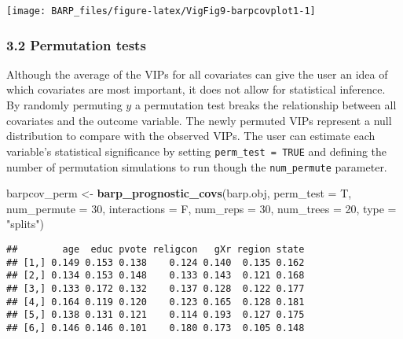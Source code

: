 \documentclass[]{article}
\newenvironment{Shaded}{\begin{snugshade}}{\end{snugshade}}
\newcommand{\KeywordTok}[1]{\textcolor[rgb]{0.13,0.29,0.53}{\textbf{#1}}}
\newcommand{\DataTypeTok}[1]{\textcolor[rgb]{0.13,0.29,0.53}{#1}}
\newcommand{\DecValTok}[1]{\textcolor[rgb]{0.00,0.00,0.81}{#1}}
\newcommand{\StringTok}[1]{\textcolor[rgb]{0.31,0.60,0.02}{#1}}
\newcommand{\OperatorTok}[1]{\textcolor[rgb]{0.81,0.36,0.00}{\textbf{#1}}}
\newcommand{\NormalTok}[1]{#1}
\begin{document}
\begin{center}\texttt{[image: BARP\_files/figure-latex/VigFig9-barpcovplot1-1]} \end{center}

\subsubsection{3.2 Permutation tests}\label{permutation-tests}

Although the average of the VIPs for all covariates can give the user an
idea of which covariates are most important, it does not allow for
statistical inference. By randomly permuting \(y\) a permutation test
breaks the relationship between all covariates and the outcome variable.
The newly permuted VIPs represent a null distribution to compare with
the observed VIPs. The user can estimate each variable's statistical
significance by setting \texttt{perm\_test\ =\ TRUE} and defining the
number of permutation simulations to run though the
\texttt{num\_permute} parameter.

\begin{Shaded}
\begin{Highlighting}[]
\NormalTok{barpcov_perm <-}\StringTok{ }\KeywordTok{barp_prognostic_covs}\NormalTok{(barp.obj,}
                                \DataTypeTok{perm_test =}\NormalTok{ T,}
                                \DataTypeTok{num_permute =} \DecValTok{30}\NormalTok{,}
                                \DataTypeTok{interactions =}\NormalTok{ F,}
                                \DataTypeTok{num_reps =} \DecValTok{30}\NormalTok{,}
                                \DataTypeTok{num_trees =} \DecValTok{20}\NormalTok{,}
                                \DataTypeTok{type =} \StringTok{"splits"}\NormalTok{)}
\end{Highlighting}
\end{Shaded}

\begin{Shaded}
\end{Shaded}

\begin{verbatim}
##        age  educ pvote religcon   gXr region state
## [1,] 0.149 0.153 0.138    0.124 0.140  0.135 0.162
## [2,] 0.134 0.153 0.148    0.133 0.143  0.121 0.168
## [3,] 0.133 0.172 0.132    0.137 0.128  0.122 0.177
## [4,] 0.164 0.119 0.120    0.123 0.165  0.128 0.181
## [5,] 0.138 0.131 0.121    0.114 0.193  0.127 0.175
## [6,] 0.146 0.146 0.101    0.180 0.173  0.105 0.148
\end{verbatim}
\end{document}

